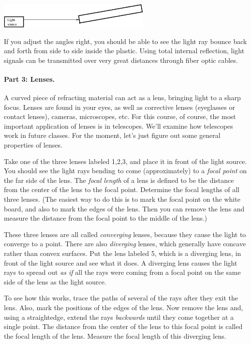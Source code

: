 \centerline{\includegraphics[width=3in]{lenses1/lensfig4.eps}}



If you adjust the angles right, you should be able to see the light ray
bounce back and forth from side to side inside the plastic.  
Using total internal reflection, 
light signals can be transmitted over very great distances through
fiber optic cables.

\paragraph{Part 3: Lenses.}
A curved piece of refracting material can act as a lens, bringing
light to a sharp focus.  Lenses are found in your eyes, as well as
corrective lenses (eyeglasses or contact lenses), cameras,
microscopes, etc.  For this course, of course, the most important
application of lenses is in telescopes.  We'll examine how telescopes
work in future classes.  For the moment, let's just figure
out some general properties of lenses.

Take one of the three lenses labeled 1,2,3, and place it in front
of the light source.  You should see the light rays bending to
come (approximately) to a {\it focal point} on the far side of the lens.  
The {\it focal length} of a lens is defined to be the distance from the center
of the lens to the focal point.  Determine the focal lengths of all
three lenses.  (The easiest way to do this is to mark the focal point
on the white board, and also to mark the edges of the lens.  Then
you can remove the lens and measure the distance from the focal
point to the middle of the lens.)

\answerspace{2.5in}

These three lenses are all called {\it converging} lenses, because
they cause the light to converge to a point.  There are also {\it diverging}
lenses, which generally have concave rather than convex surfaces.  Put
the lens labeled 5, which is a diverging lens, 
in front of the light source and see what it does.
A diverging lens causes the light rays to spread out {\it as if} all the
rays were coming from a focal point on the same side of the lens
as the light source.

To see how this works, trace the paths of several of the rays 
after they exit the lens.  Also, mark the positions of the edges
of the lens.  Now remove the lens and, using a straightedge, extend
the rays {\it backwards} until they come together at a single point.  
The distance from the center of the lens to this focal point is
called the focal length of the lens.  Measure the focal length
of this diverging lens.

